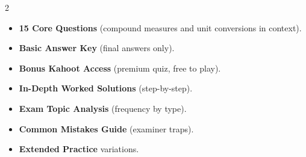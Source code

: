 \documentclass[11pt,a4paper]{article}
\newcommand{\FullReleaseDate}{April 30, 2026}
\begin{document}
\vspace{8pt}

\begin{multicols}{2}
  \begin{tcolorbox}[card, title=\sffamily\bfseries\textcolor{white}{\faHandPointDown\ TODAY (Simplified Version)}, colbacktitle=mainblue, boxed title style={sharp corners, boxrule=0pt}]
    \begin{itemize}[leftmargin=1.2em, itemsep=2pt]
      \item \small \textbf{15 Core Questions} (compound measures and unit conversions in context).
      \item \small \textbf{Basic Answer Key} (final answers only).
      \item \small \textbf{Bonus Kahoot Access} (premium quiz, free to play).
    \end{itemize}
  \end{tcolorbox}

  \columnbreak

  \begin{tcolorbox}[card, title=\sffamily\bfseries\textcolor{white}{\faRocket\ ON \FullReleaseDate\ (Full Upgrade)}, colbacktitle=mainblue, boxed title style={sharp corners, boxrule=0pt}]
    \begin{itemize}[leftmargin=1.2em, itemsep=2pt]
      \item \small \textbf{In-Depth Worked Solutions} (step-by-step).
      \item \small \textbf{Exam Topic Analysis} (frequency by type).
      \item \small \textbf{Common Mistakes Guide} (examiner traps).
      \item \small \textbf{Extended Practice} variations.
    \end{itemize}
  \end{tcolorbox}
\end{multicols}
\end{document}
